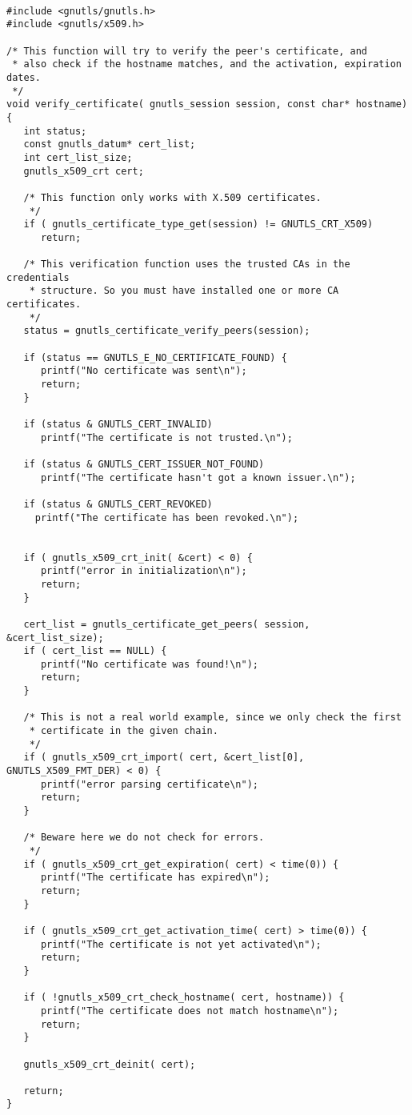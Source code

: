 \label{ex:rfc2818}

\begin{verbatim}

#include <gnutls/gnutls.h>
#include <gnutls/x509.h>

/* This function will try to verify the peer's certificate, and
 * also check if the hostname matches, and the activation, expiration dates.
 */
void verify_certificate( gnutls_session session, const char* hostname)
{
   int status;
   const gnutls_datum* cert_list;
   int cert_list_size;
   gnutls_x509_crt cert;

   /* This function only works with X.509 certificates.
    */
   if ( gnutls_certificate_type_get(session) != GNUTLS_CRT_X509)
      return;

   /* This verification function uses the trusted CAs in the credentials
    * structure. So you must have installed one or more CA certificates.
    */
   status = gnutls_certificate_verify_peers(session);

   if (status == GNUTLS_E_NO_CERTIFICATE_FOUND) {
      printf("No certificate was sent\n");
      return;
   }

   if (status & GNUTLS_CERT_INVALID)
      printf("The certificate is not trusted.\n");

   if (status & GNUTLS_CERT_ISSUER_NOT_FOUND)
      printf("The certificate hasn't got a known issuer.\n");

   if (status & GNUTLS_CERT_REVOKED)
     printf("The certificate has been revoked.\n");


   if ( gnutls_x509_crt_init( &cert) < 0) {
      printf("error in initialization\n");
      return;
   }

   cert_list = gnutls_certificate_get_peers( session, &cert_list_size);
   if ( cert_list == NULL) {
      printf("No certificate was found!\n");
      return;
   }

   /* This is not a real world example, since we only check the first 
    * certificate in the given chain.
    */
   if ( gnutls_x509_crt_import( cert, &cert_list[0], GNUTLS_X509_FMT_DER) < 0) {
      printf("error parsing certificate\n");
      return;
   }

   /* Beware here we do not check for errors.
    */
   if ( gnutls_x509_crt_get_expiration( cert) < time(0)) {
      printf("The certificate has expired\n");
      return;
   }

   if ( gnutls_x509_crt_get_activation_time( cert) > time(0)) {
      printf("The certificate is not yet activated\n");
      return;
   }

   if ( !gnutls_x509_crt_check_hostname( cert, hostname)) {
      printf("The certificate does not match hostname\n");
      return;
   }

   gnutls_x509_crt_deinit( cert);

   return;
}

\end{verbatim}
